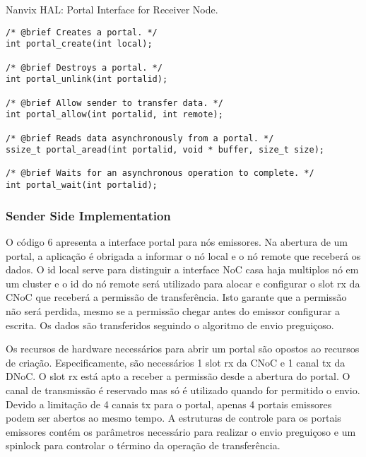 \begin{listing}[!tb]
\caption{Nanvix HAL: Portal Interface for Receiver Node.}
\label{code:hal-portal-receiver}
\begin{verbatim}
/* @brief Creates a portal. */
int portal_create(int local);

/* @brief Destroys a portal. */
int portal_unlink(int portalid);

/* @brief Allow sender to transfer data. */
int portal_allow(int portalid, int remote);

/* @brief Reads data asynchronously from a portal. */
ssize_t portal_aread(int portalid, void * buffer, size_t size);

/* @brief Waits for an asynchronous operation to complete. */
int portal_wait(int portalid);
\end{verbatim}
\end{listing}

			\subsubsection{Sender Side Implementation}

				O código 6 apresenta a interface portal para nós emissores.
				Na abertura de um portal, a aplicação é obrigada a informar o nó local e o nó remote que receberá os dados.
				O id local serve para distinguir a interface NoC casa haja multiplos nó em um cluster e o id do nó remote será utilizado para alocar e configurar o slot rx da CNoC que receberá a permissão de transferência.
				Isto garante que a permissão não será perdida, mesmo se a permissão chegar antes do emissor configurar a escrita.
				Os dados são transferidos seguindo o algoritmo de envio preguiçoso.

				Os recursos de hardware necessários para abrir um portal são opostos ao recursos de criação.
				Especificamente, são necessários 1 slot rx da CNoC e 1 canal tx da DNoC.
				O slot rx está apto a receber a permissão desde a abertura do portal.
				O canal de transmissão é reservado mas só é utilizado quando for permitido o envio.
				Devido a limitação de 4 canais tx para o portal, apenas 4 portais emissores podem ser abertos ao mesmo tempo.
				A estruturas de controle para os portais emissores contém os parâmetros necessário para realizar o envio preguiçoso e um spinlock para controlar o término da operação de transferência.

